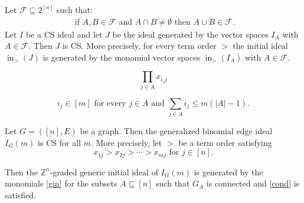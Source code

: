 \documentclass[10pt,a4paper]{amsart}
\def\ZZ{\mathbb{Z}}
\def\ini{\operatorname{in}}
\begin{document}
\begin{proposition}
\label{easy2} Let $\mathcal{F}\subseteq 2^{[n]}$ such that:
\begin{align} \label{eq:union}
    \text{ if } A,B\in \mathcal{F}  \text{ and } A\cap B\neq \emptyset \text{ then } A\cup B\in \mathcal{F}. 
    \end{align}
    Let $I$ be a CS ideal and  let $J$ be the ideal generated by the vector spaces $I_A$ with $A\in \mathcal{F}$. Then $J$ is CS. More precisely, for every term order $>$ the initial ideal  
$\ini_{>}(J)$ is generated  by the monomial vector spaces $\ini_{>}(I_A)$ with $A\in \mathcal{F}$. 
\end{proposition}

\begin{equation} 
\label{gin}
 \prod_{j\in A} x_{i_jj} 
 \end{equation}  

 \begin{equation} 
\label{cond} 
   i_j\in [m]   \mbox{ for every } j\in A \mbox{  and  } \sum_{j\in A} i_j\leq m(|A|-1).
  \end{equation}   

 \begin{theorem} 
 \label{main} Let $G = ([n],E)$ be a graph. 
 Then the generalized binomial edge ideal $I_G(m)$ is CS for all $m$. 
 More precisely, let $>$ be a term order satisfying
 $$x_{1j}>x_{2j} > \cdots > x_{mj} \text{ for } j \in [n].$$
 
 Then  the $\ZZ^n$-graded  generic initial ideal of $I_G(m)$ is generated by the monomials \eqref{gin} for the subsets $A \subseteq[n]$
 such that $G_A$ is connected and \eqref{cond} is satisfied.
\end{theorem}
\end{document}
